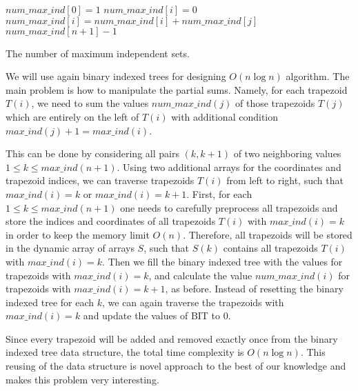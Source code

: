 \documentclass[11pt,letter]{article}
\begin{document}
\begin{algorithm}

    $num\_max\_ind [0] = 1$\;
    {
        $num\_max\_ind [i] = 0$\;
        {
            {
                $num\_max\_ind [i] = num\_max\_ind [i] + num\_max\_ind [j]$\;
            }
        }
    }
    \Return $num\_max\_ind [n + 1] - 1$\;

    \caption{ The number of maximum independent sets. }
\end{algorithm}


We will use again binary indexed trees for designing $O (n \log n)$ algorithm. The main problem is
how to manipulate the partial sums. Namely, for each trapezoid $T(i)$, we need to sum the values
$num\_max\_ind (j)$ of those trapezoids $T(j)$ which are entirely on the left of $T(i)$ with
additional condition $max\_ind (j) + 1 = max\_ind (i)$.

This can be done by considering all pairs $(k, k + 1)$ of two neighboring values $1 \leq k \leq
max\_ind (n + 1)$. Using two additional arrays for the coordinates and trapezoid indices, we can
traverse trapezoids $T (i)$ from left to right, such that $max\_ind (i) = k$ or $max\_ind (i) = k +
1$. First, for each $1 \leq k \leq max\_ind (n + 1)$ one needs to carefully preprocess all
trapezoids and store the indices and coordinates of all trapezoids $T (i)$ with $max\_ind (i) = k$
in order to keep the memory limit $O (n)$. Therefore, all trapezoids will be stored in the dynamic
array of arrays $S$, such that $S (k)$ contains all trapezoids $T (i)$ with $max\_ind (i) = k$.
Then we fill the binary indexed tree with the values for trapezoids with $max\_ind (i) = k$, and
calculate the value $num\_max\_ind (i)$ for trapezoids with $max\_ind (i) = k + 1$, as before.
Instead of resetting the binary indexed tree for each $k$, we can again traverse the trapezoids
with $max\_ind (i) = k$ and update the values of BIT to $0$.

Since every trapezoid will be added and removed exactly once from the binary indexed tree data
structure, the total time complexity is $O (n \log n)$. This reusing of the data structure is novel
approach to the best of our knowledge and makes this problem very interesting.
\medskip
\end{document}
